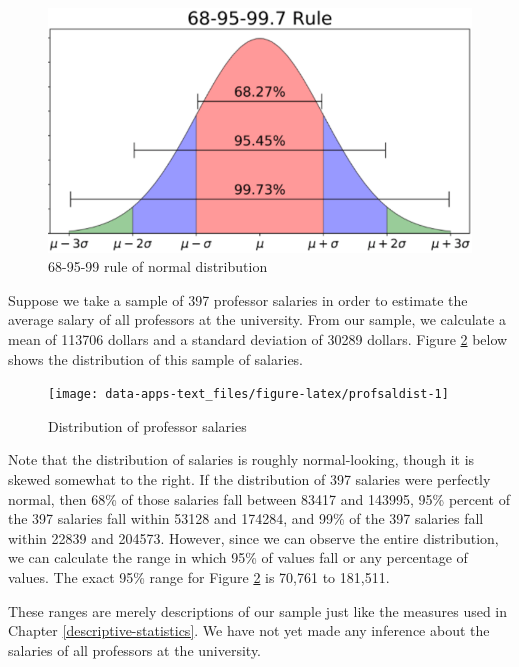 \documentclass[
]{book}
\begin{document}
\begin{figure}

{\centering \includegraphics[width=\textwidth]{images/normdist} 

}

\caption{68-95-99 rule of normal distribution}\label{fig:normdist}
\end{figure}

Suppose we take a sample of 397 professor salaries in order to estimate the average salary of all professors at the university. From our sample, we calculate a mean of 113706 dollars and a standard deviation of 30289 dollars. Figure \ref{fig:profsaldist} below shows the distribution of this sample of salaries.

\begin{figure}

{\centering \texttt{[image: data-apps-text\_files/figure-latex/profsaldist-1]} 

}

\caption{Distribution of professor salaries}\label{fig:profsaldist}
\end{figure}

Note that the distribution of salaries is roughly normal-looking, though it is skewed somewhat to the right. If the distribution of 397 salaries were perfectly normal, then 68\% of those salaries fall between 83417 and 143995, 95\% percent of the 397 salaries fall within 53128 and 174284, and 99\% of the 397 salaries fall within 22839 and 204573. However, since we can observe the entire distribution, we can calculate the range in which 95\% of values fall or any percentage of values. The exact 95\% range for Figure \ref{fig:profsaldist} is 70,761 to 181,511.

These ranges are merely descriptions of our sample just like the measures used in Chapter \ref{descriptive-statistics}. We have not yet made any inference about the salaries of all professors at the university.
\end{document}
